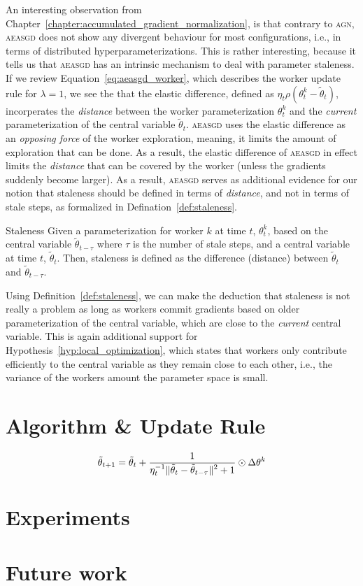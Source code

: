 An interesting observation from Chapter~\ref{chapter:accumulated_gradient_normalization}, is that contrary to \textsc{agn}, \textsc{aeasgd} does not show any divergent behaviour for most configurations, i.e., in terms of distributed hyperparameterizations. This is rather interesting, because it tells us that \textsc{aeasgd} has an intrinsic mechanism to deal with parameter staleness. If we review Equation~\ref{eq:aeasgd_worker}, which describes the worker update rule for $\lambda = 1$, we see the that the elastic difference, defined as $\eta_t\rho(\theta^k_t - \tilde{\theta}_t)$, incorperates the \emph{distance} between the worker parameterization $\theta^k_t$ and the \emph{current} parameterization of the central variable $\tilde{\theta}_t$. \textsc{aeasgd} uses the elastic difference as an \emph{opposing force} of the worker exploration, meaning, it limits the amount of exploration that can be done. As a result, the elastic difference of \textsc{aeasgd} in effect limits the \emph{distance} that can be covered by the worker (unless the gradients suddenly become larger). As a result, \textsc{aeasgd} serves as additional evidence for our notion that staleness should be defined in terms of \emph{distance}, and not in terms of stale steps, as formalized in Defination~\ref{def:staleness}.

\begin{definition}{Staleness}
  \label{def:staleness}
  Given a parameterization for worker $k$ at time $t$, $\theta^k_t$, based on the central variable $\tilde{\theta}_{t - \tau}$ where $\tau$ is the number of stale steps, and a central variable at time $t$, $\tilde{\theta}_t$. Then, staleness is defined as the difference (distance) between $\tilde{\theta}_t$ and $\tilde{\theta}_{t-\tau}$.
\end{definition}

Using Definition~\ref{def:staleness}, we can make the deduction that staleness is not really a problem as long as workers commit gradients based on older parameterization of the central variable, which are close to the \emph{current} central variable. This is again additional support for Hypothesis~\ref{hyp:local_optimization}, which states that workers only contribute efficiently to the central variable as they remain close to each other, i.e., the variance of the workers amount the parameter space is small.

\section{Algorithm \& Update Rule}
\label{sec:adag_algorithm}

\begin{equation}
  \label{eq:adag}
  \tilde{\theta}_{t+1} = \tilde{\theta}_t + \frac{\displaystyle 1}{\displaystyle \eta_t^{-1}\|\tilde{\theta}_t - \tilde{\theta}_{t - \tau}\|^2 + 1} \odot \Delta\theta^k
\end{equation}

\section{Experiments}
\label{sec:adag_experiments}

\section{Future work}
\label{sec:adag_future_work}
